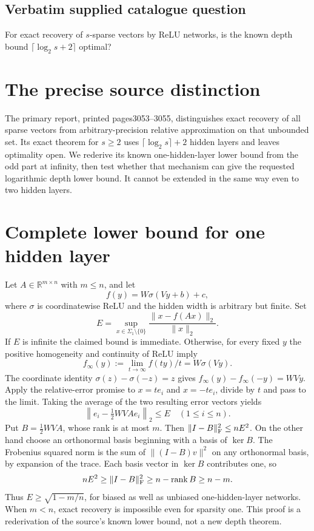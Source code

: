 \documentclass[11pt]{article}
\begin{document}
\subsection{Verbatim supplied catalogue question}
For exact recovery of $s$-sparse vectors by ReLU networks, is the known depth bound $\lceil\log_2s+2\rceil$ optimal?

\section{The precise source distinction}
The primary report, printed pages3053--3055, distinguishes exact
recovery of all sparse vectors from arbitrary-precision relative
approximation on that unbounded set. Its exact theorem for
$s\ge2$ uses $\lceil\log_2s\rceil+2$ hidden layers and leaves
optimality open. We rederive its known one-hidden-layer lower
bound from the odd part at infinity, then test whether that
mechanism can give the requested logarithmic depth lower bound.
It cannot be extended in the same way even to two hidden layers.

\section{Complete lower bound for one hidden layer}
Let $A\in\mathbb R^{m\times n}$ with $m\le n$, and let
\[
 f(y)=W\sigma(Vy+b)+c,
\]
where $\sigma$ is coordinatewise ReLU and the hidden width is
arbitrary but finite. Set
\[
 E=\sup_{x\in\Sigma_1\setminus\{0\}}
 \frac{\|x-f(Ax)\|_2}{\|x\|_2}.
\]
If $E$ is infinite the claimed bound is immediate. Otherwise,
for every fixed $y$ the positive homogeneity and continuity of
ReLU imply
\[
 f_\infty(y):=\lim_{t\to\infty}f(ty)/t=W\sigma(Vy).
\]
The coordinate identity $\sigma(z)-\sigma(-z)=z$ gives
$f_\infty(y)-f_\infty(-y)=WVy$. Apply the relative-error
promise to $x=te_i$ and $x=-te_i$, divide by $t$ and pass
to the limit. Taking the average of the two resulting error
vectors yields
\[
 \left\|e_i-\tfrac12WVAe_i\right\|_2\le E
 \quad(1\le i\le n).
\]
Put $B=\tfrac12WVA$, whose rank is at most $m$. Then
$\|I-B\|_{\rm F}^2\le nE^2$. On the other hand choose an
orthonormal basis beginning with a basis of $\ker B$. The
Frobenius squared norm is the sum of $\|(I-B)v\|^2$ on any
orthonormal basis, by expansion of the trace. Each basis vector
in $\ker B$ contributes one, so
\[
 nE^2\ge\|I-B\|_{\rm F}^2\ge n-\operatorname{rank}B\ge n-m.
\]
Thus $E\ge\sqrt{1-m/n}$, for biased as well as unbiased
one-hidden-layer networks. When $m<n$, exact recovery is
impossible even for sparsity one. This proof is a rederivation
of the source's known lower bound, not a new depth theorem.
\end{document}
